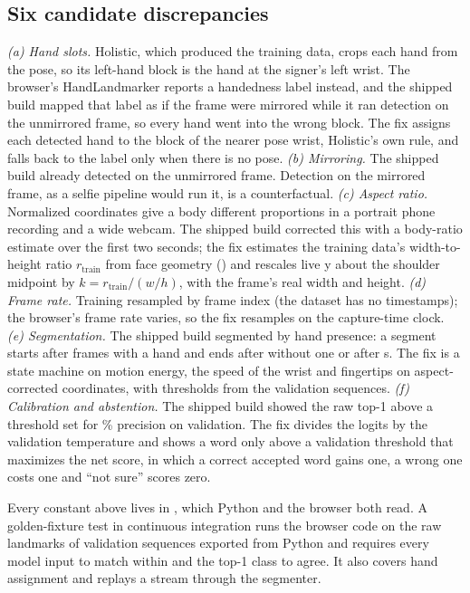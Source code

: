 \subsection{Six candidate discrepancies}
\label{sec:faults}

\emph{(a) Hand slots.} Holistic, which produced the training data, crops each hand from the
pose, so its left-hand block is the hand at the signer's left wrist. The browser's
HandLandmarker reports a handedness label instead, and the shipped build mapped that label as if
the frame were mirrored while it ran detection on the unmirrored frame, so every hand went into the
wrong block. The fix assigns each detected hand to the block of the nearer pose wrist, Holistic's
own rule, and falls back to the label only when there is no pose.
\emph{(b) Mirroring.} The shipped build already detected on the unmirrored frame. Detection on
the mirrored frame, as a selfie pipeline would run it, is a counterfactual.
\emph{(c) Aspect ratio.} Normalized coordinates give a body different proportions in a portrait
phone recording and a wide webcam. The shipped build corrected this with a body-ratio estimate
over the first two seconds; the fix estimates the training data's width-to-height ratio
$r_{\mathrm{train}}$ from face geometry () and rescales live y about the shoulder
midpoint by $k = r_{\mathrm{train}} / (w/h)$, with the frame's real width and height.
\emph{(d) Frame rate.} Training resampled by frame index (the dataset has no timestamps); the
browser's frame rate varies, so the fix resamples on the capture-time clock.
\emph{(e) Segmentation.} The shipped build segmented by hand presence: a segment starts after
 frames with a hand and ends after  without one or after  s.
The fix is a state machine on motion energy, the speed of the wrist and fingertips on
aspect-corrected coordinates, with thresholds from the validation sequences.
\emph{(f) Calibration and abstention.} The shipped build showed the raw top-1 above a threshold
set for \% precision on validation. The fix divides the logits by the validation
temperature and shows a word only above a validation threshold that maximizes the net score, in
which a correct accepted word gains one, a wrong one costs one and ``not sure'' scores zero.

Every constant above lives in , which Python and the browser both read.
A golden-fixture test in continuous integration runs the browser code on the raw landmarks of
 validation sequences exported from Python and requires every model input to match
within  and the top-1 class to agree. It also covers hand assignment and replays a
stream through the segmenter.

